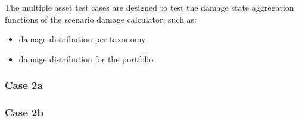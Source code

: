 The multiple asset test cases are designed to test the damage state aggregation functions of the scenario damage calculator, such as:

\begin{itemize}
\item damage distribution per taxonomy
\item damage distribution for the portfolio
\end{itemize}

\subsubsection{Case 2a}


\subsubsection{Case 2b}
